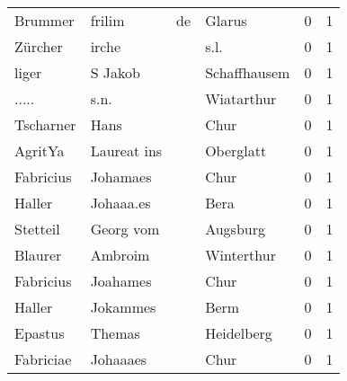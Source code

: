 \begin{center}
\begin{tiny}
\begin{longtabu}{llllrr}
                  Brummer &                             frilim &          de &                                      Glarus &          0 &         1 \\
                  Zürcher &                              irche &             &                                        s.l. &          0 &         1 \\
                    liger &                            S Jakob &             &                                Schaffhausem &          0 &         1 \\
                    ..... &                               s.n. &             &                                  Wiatarthur &          0 &         1 \\
                Tscharner &                               Hans &             &                                        Chur &          0 &         1 \\
                  AgritYa &                        Laureat ins &             &                                   Oberglatt &          0 &         1 \\
                Fabricius &                           Johamaes &             &                                        Chur &          0 &         1 \\
                   Haller &                          Johaaa.es &             &                                        Bera &          0 &         1 \\
                 Stetteil &                          Georg vom &             &                                    Augsburg &          0 &         1 \\
                  Blaurer &                            Ambroim &             &                                  Winterthur &          0 &         1 \\
                Fabricius &                           Joahames &             &                                        Chur &          0 &         1 \\
                   Haller &                           Jokammes &             &                                        Berm &          0 &         1 \\
                  Epastus &                             Themas &             &                                  Heidelberg &          0 &         1 \\
                Fabriciae &                           Johaaaes &             &                                        Chur &          0 &         1 \\

\end{longtabu}
\end{tiny}
\end{center}
